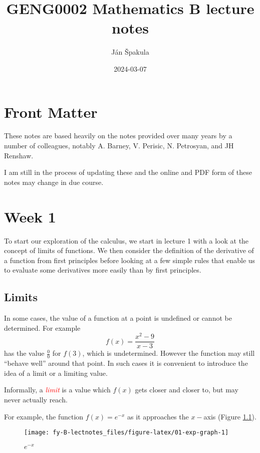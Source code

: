 \documentclass[
  11pt,
  oneside]{book}
\title{GENG0002 Mathematics B lecture notes}
\author{Ján Špakula}
\date{2024-03-07}
\newcommand{\slide}{}
\theoremstyle{definition}
\theoremstyle{definition}
\theoremstyle{definition}
\theoremstyle{definition}
\theoremstyle{remark}
\begin{document}
\maketitle

{
\setcounter{tocdepth}{1}
\tableofcontents
}
\chapter*{Front Matter}\label{front-matter}

These notes are based heavily on the notes provided over many years by a number of colleagues, notably A. Barney, V. Perisic, N. Petrosyan, and JH Renshaw.

I am still in the process of updating these and the online and PDF form of these notes may change in due course.

\chapter{Week 1}\label{week-one}

To start our exploration of the calculus, we start in lecture 1 with a look at the concept of limits of functions. We then consider the definition of the derivative of a function from first principles before looking at a few simple rules that enable us to evaluate some derivatives more easily than by first principles.
\slide

\section{Limits}\label{lecture-one}

In some cases, the value of a function at a point is undefined or cannot be determined. For example
\[
f(x) = \frac{x^2-9}{x-3}\tag{1}
\]
has the value \(\frac00\) for \(f(3)\), which is undetermined. However the function may still ``behave well'' around that point. In such cases it is convenient to introduce the idea of a limit or a limiting value.

Informally, a \textcolor{red}{\em limit} is a value which \(f(x)\) gets closer and closer to, but may never actually reach.

\slide

For example, the function \(f(x) = e^{-x}\) as it approaches the \(x-\)axis (Figure \ref{fig:01-exp-graph}).

\begin{figure}

{\centering \texttt{[image: fy-B-lectnotes\_files/figure-latex/01-exp-graph-1]} 

}

\caption{$e^{-x}$}\label{fig:01-exp-graph}
\end{figure}
\end{document}
